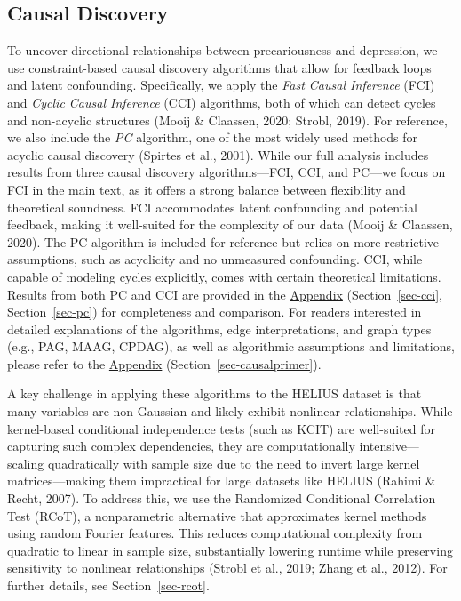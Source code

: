 \documentclass[
]{article}
\begin{document}
\subsection{Causal Discovery}\label{sec-analysis}

To uncover directional relationships between precariousness and
depression, we use constraint-based causal discovery algorithms that
allow for feedback loops and latent confounding. Specifically, we apply
the \emph{Fast Causal Inference} (FCI) and \emph{Cyclic Causal
Inference} (CCI) algorithms, both of which can detect cycles and
non-acyclic structures (Mooij \& Claassen, 2020; Strobl, 2019). For
reference, we also include the \emph{PC} algorithm, one of the most
widely used methods for acyclic causal discovery (Spirtes et al., 2001).
While our full analysis includes results from three causal discovery
algorithms---FCI, CCI, and PC---we focus on FCI in the main text, as it
offers a strong balance between flexibility and theoretical soundness.
FCI accommodates latent confounding and potential feedback, making it
well-suited for the complexity of our data (Mooij \& Claassen, 2020).
The PC algorithm is included for reference but relies on more
restrictive assumptions, such as acyclicity and no unmeasured
confounding. CCI, while capable of modeling cycles explicitly, comes
with certain theoretical limitations. Results from both PC and CCI are
provided in the \hyperref[sec-appendix]{Appendix}
(Section~\ref{sec-cci}, Section~\ref{sec-pc}) for completeness and
comparison. For readers interested in detailed explanations of the
algorithms, edge interpretations, and graph types (e.g., PAG, MAAG,
CPDAG), as well as algorithmic assumptions and limitations, please refer
to the \hyperref[sec-appendix]{Appendix}
(Section~\ref{sec-causalprimer}).

A key challenge in applying these algorithms to the HELIUS dataset is
that many variables are non-Gaussian and likely exhibit nonlinear
relationships. While kernel-based conditional independence tests (such
as KCIT) are well-suited for capturing such complex dependencies, they
are computationally intensive---scaling quadratically with sample size
due to the need to invert large kernel matrices---making them
impractical for large datasets like HELIUS (Rahimi \& Recht, 2007). To
address this, we use the Randomized Conditional Correlation Test (RCoT),
a nonparametric alternative that approximates kernel methods using
random Fourier features. This reduces computational complexity from
quadratic to linear in sample size, substantially lowering runtime while
preserving sensitivity to nonlinear relationships (Strobl et al., 2019;
Zhang et al., 2012). For further details, see Section~\ref{sec-rcot}.
\end{document}
